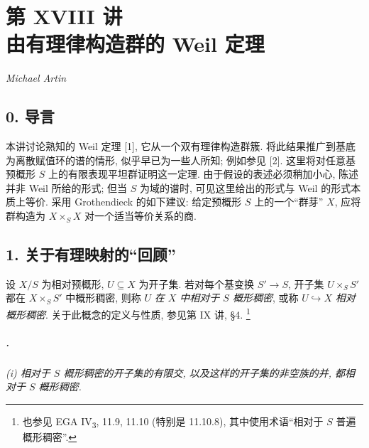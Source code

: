 \setcounter{footnote}{0}
\chapter*{第 XVIII 讲\\由有理律构造群的 Weil 定理}
\begin{center}
  \textit{Michael Artin}
\end{center}
\begingroup
\renewcommand{\thefootnote}{0}
\endgroup

\section*{0. 导言}

本讲讨论熟知的 Weil 定理 [1], 它从一个双有理律构造群簇.
将此结果推广到基底为离散赋值环的谱的情形, 似乎早已为一些人所知; 例如参见 [2].
这里将对任意基预概形 \(S\) 上的有限表现平坦群证明这一定理.
由于假设的表述必须稍加小心, 陈述并非 Weil 所给的形式;
但当 \(S\) 为域的谱时, 可见这里给出的形式与 Weil 的形式本质上等价.
采用 Grothendieck 的如下建议:
给定预概形 \(S\) 上的一个“群芽” \(X\), 应将群构造为 \(X\times_S X\)
对一个适当等价关系的商.

\section*{1. 关于有理映射的“回顾”}

设 \(X/S\) 为相对预概形, \(U\subseteq X\) 为开子集.
若对每个基变换 \(S'\to S\), 开子集 \(U\times_S S'\)
都在 \(X\times_S S'\) 中概形稠密,
则称 \(U\) \emph{在 \(X\) 中相对于 \(S\) 概形稠密},
或称 \(U\hookrightarrow X\) \emph{相对概形稠密}.
关于此概念的定义与性质, 参见第 IX 讲, \S4.\begingroup
\renewcommand{\thefootnote}{*}\footnote{也参见 EGA IV\textsubscript{3}, 11.9, 11.10
(特别是 11.10.8), 其中使用术语“相对于 \(S\) 普遍概形稠密”.}
\addtocounter{footnote}{-1}
\endgroup

\paragraph{.}
\textit{(i) 相对于 \(S\) 概形稠密的开子集的有限交,
以及这样的开子集的非空族的并, 都相对于 \(S\) 概形稠密.}

